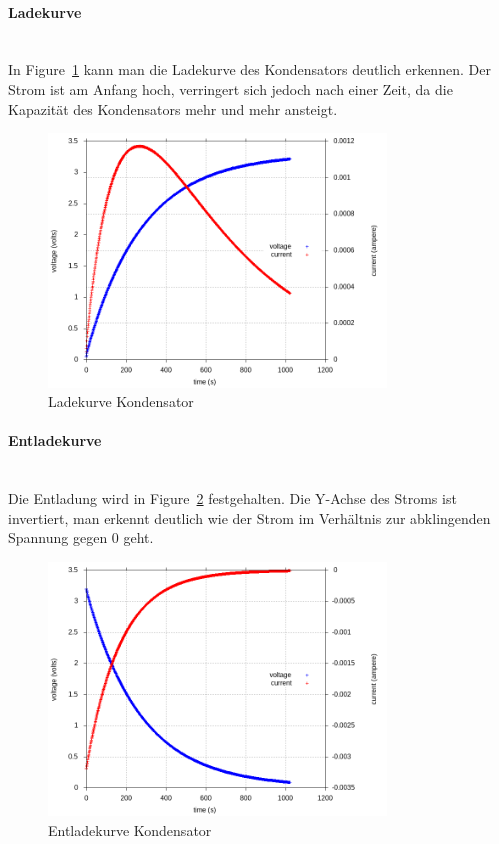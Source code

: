 \documentclass{article}
\begin{document}
\paragraph{Ladekurve}\mbox{}\\
In Figure~\ref{fig:Ladekurve} kann man die Ladekurve des Kondensators deutlich erkennen. 
Der Strom ist am Anfang hoch, verringert sich jedoch nach einer Zeit, da die Kapazität des Kondensators mehr und mehr ansteigt.
\begin{figure}[h!]
    \centering
    \includegraphics[width=0.8\textwidth]{rc_charging_curve_voltage_current.png}
    \caption{Ladekurve Kondensator}
    \label{fig:Ladekurve}
\end{figure}

\newpage
\paragraph{Entladekurve}\mbox{}\\
Die Entladung wird in Figure~\ref{fig:Entladekurve} festgehalten. 
Die Y-Achse des Stroms ist invertiert, man erkennt deutlich wie der Strom im Verhältnis zur abklingenden Spannung gegen 0 geht.

\begin{figure}[h!]
    \centering
    \includegraphics[width=0.8\textwidth]{rc_discharging_curve_voltage_current.png}
    \caption{Entladekurve Kondensator}
    \label{fig:Entladekurve}
\end{figure}
\end{document}
